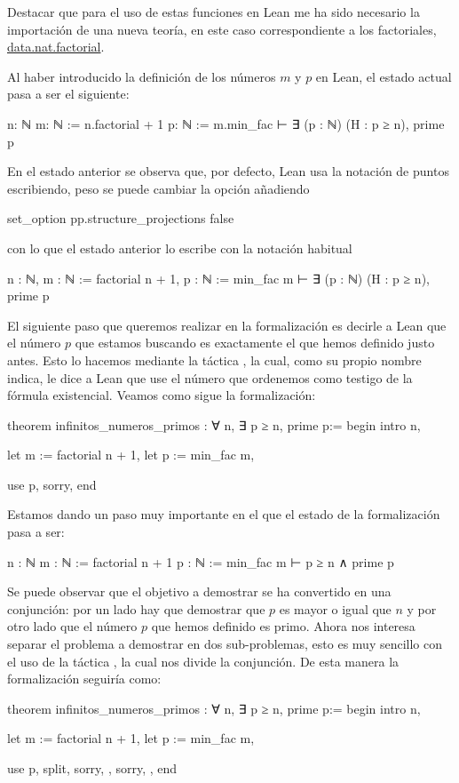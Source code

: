 Destacar que para el uso de estas funciones en Lean me ha sido necesario
la importación de una nueva teoría, en este caso correspondiente a los
factoriales,
\href{https://github.com/leanprover-community/mathlib/blob/master/src/data/nat/factorial.lean}{data.nat.factorial}.

Al haber introducido la definición de los números \(m\) y \(p\) en Lean,
el estado actual pasa a ser el siguiente:
\begin{leancode}
n: ℕ
m: ℕ := n.factorial + 1
p: ℕ := m.min_fac
⊢ ∃ (p : ℕ) (H : p ≥ n), prime p
\end{leancode}

En el estado anterior se observa que, por defecto, Lean usa la notación
de puntos escribiendo, peso se puede cambiar la opción añadiendo
\begin{leancode}
set_option pp.structure_projections false
\end{leancode}
con lo que el estado anterior lo escribe con la notación habitual
\begin{leancode}
n : ℕ,
m : ℕ := factorial n + 1,
p : ℕ := min_fac m
⊢ ∃ (p : ℕ) (H : p ≥ n), prime p
\end{leancode}

El siguiente paso que queremos realizar en la formalización es decirle a
Lean que el número \(p\) que estamos buscando es exactamente el que
hemos definido justo antes. Esto lo hacemos mediante la táctica
, la cual, como su propio nombre indica, le dice a
Lean que use el número que ordenemos como testigo de la fórmula
existencial. Veamos como sigue la formalización:

\begin{leancode}
theorem infinitos_numeros_primos : ∀ n, ∃ p ≥ n, prime p:=
begin
  intro n,

  let m := factorial n + 1,
  let p := min_fac m,

  use p,
  sorry,
end
\end{leancode}

Estamos dando un paso muy importante en el que el estado de la formalización
pasa a ser:
\begin{leancode}
n : ℕ
m : ℕ := factorial n + 1
p : ℕ := min_fac m
⊢ p ≥ n ∧ prime p
\end{leancode}

Se puede observar que el objetivo a demostrar se ha convertido en una
conjunción: por un lado hay que demostrar que \(p\) es mayor o igual que
\(n\) y por otro lado que el número \(p\) que hemos definido es primo. Ahora
nos interesa separar el problema a demostrar en dos sub-problemas, esto es
muy sencillo con el uso de la táctica , la cual nos
divide la conjunción. De esta manera la formalización seguiría como:
\begin{leancode}
theorem infinitos_numeros_primos : ∀ n, ∃ p ≥ n, prime p:=
begin
  intro n,

  let m := factorial n + 1,
  let p := min_fac m,

  use p,
  split,
  { sorry, },
  { sorry, },
end
\end{leancode}

